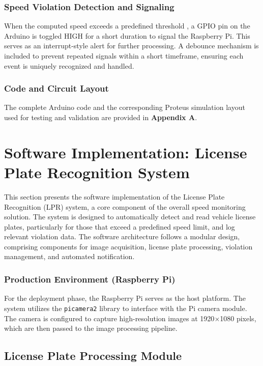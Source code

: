 \subsubsection*{Speed Violation Detection and Signaling}

When the computed speed exceeds a predefined threshold , a GPIO pin on the Arduino is toggled HIGH for a short duration to signal the Raspberry Pi. This serves as an interrupt-style alert for further processing. A debounce mechanism is included to prevent repeated signals within a short timeframe, ensuring each event is uniquely recognized and handled.

\subsubsection*{Code and Circuit Layout}

The complete Arduino code and the corresponding Proteus simulation layout used for testing and validation are provided in \textbf{Appendix A}.

\section{Software Implementation: License Plate Recognition System}

This section presents the software implementation of the License Plate Recognition (LPR) system, a core component of the overall speed monitoring solution. The system is designed to automatically detect and read vehicle license plates, particularly for those that exceed a predefined speed limit, and log relevant violation data. The software architecture follows a modular design, comprising components for image acquisition, license plate processing, violation management, and automated notification.

\subsubsection*{Production Environment (Raspberry Pi)}

For the deployment phase, the Raspberry Pi serves as the host platform. The system utilizes the \texttt{picamera2} library to interface with the Pi camera module. The camera is configured to capture high-resolution images at 1920$\times$1080 pixels, which are then passed to the image processing pipeline.


\subsection{License Plate Processing Module}

